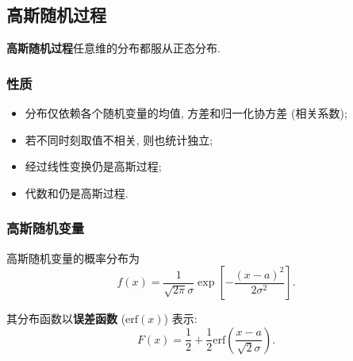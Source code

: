 \subsection{高斯随机过程}
\textbf{高斯随机过程}\quad 任意维的分布都服从正态分布.

\subsubsection{性质}
\begin{itemize}
    \item 分布仅依赖各个随机变量的均值, 方差和归一化协方差 (相关系数);
    \item 若不同时刻取值不相关, 则也统计独立;
    \item 经过线性变换仍是高斯过程;
    \item 代数和仍是高斯过程.
\end{itemize}

\subsubsection{高斯随机变量}
高斯随机变量的概率分布为
\begin{equation}
    f(x)=\frac{1}{\sqrt{2\pi}\sigma}\exp\left[-\frac{(x-a)^2}{2\sigma^2}\right].
\end{equation}

其分布函数以\textbf{误差函数} ($\mathrm{erf}(x)$) 表示:
\begin{equation}
    F(x)=\frac{1}{2}+\frac{1}{2}\mathrm{erf}\left(\frac{x-a}{\sqrt{2}\sigma}\right).
\end{equation}
